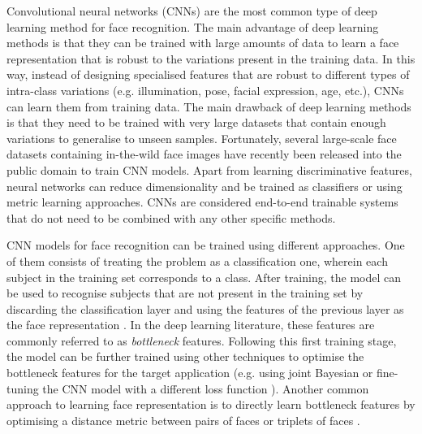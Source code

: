 \documentclass[conference]{IEEEtran}
\begin{document}
Convolutional neural networks (CNNs) are the most common type of deep learning method for face recognition. The main advantage of deep learning methods is that they can be trained with large amounts of data to learn a face representation that is robust to the variations present in the training data. In this way, instead of designing specialised features that are robust to different types of intra-class variations (e.g. illumination, pose, facial expression, age, etc.), CNNs can learn them from training data. The main drawback of deep learning methods is that they need to be trained with very large datasets that contain enough variations to generalise to unseen samples. Fortunately, several large-scale face datasets containing in-the-wild face images have recently been released into the public domain \cite{sun2014deep,yi2014learning,parkhi2015deep,guo2016ms,nech2017level,bansal2017umdfaces,cao2017vggface2} to train CNN models. Apart from learning discriminative features, neural networks can reduce dimensionality and be trained as classifiers or using metric learning approaches. CNNs are considered end-to-end trainable systems that do not need to be combined with any other specific methods.

CNN models for face recognition can be trained using different approaches. One of them consists of treating the problem as a classification one, wherein each subject in the training set corresponds to a class. After training, the model can be used to recognise subjects that are not present in the training set by discarding the classification layer and using the features of the previous layer as the face representation \cite{taigman2014deepface}. In the deep learning literature, these features are commonly referred to as \textit{bottleneck} features. Following this first training stage, the model can be further trained using other techniques to optimise the bottleneck features for the target application (e.g. using joint Bayesian \cite{sun2014deep} or fine-tuning the CNN model with a different loss function \cite{yi2014learning}). Another common approach to learning face representation is to directly learn bottleneck features by optimising a distance metric between pairs of faces \cite{chopra2005learning,fan2014learning} or triplets of faces \cite{schroff2015facenet}.
\end{document}
